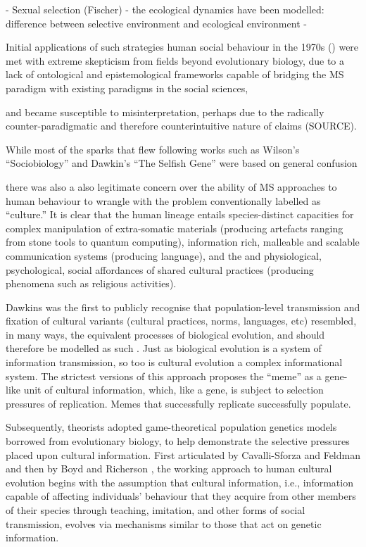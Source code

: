  - Sexual selection (Fischer)
 - the ecological dynamics have been modelled: difference between selective environment and ecological environment
 -

Initial applications of such strategies human social behaviour in the 1970s  (\citep{Wilson1975,Dawkins1976}) were met with extreme skepticism from fields beyond evolutionary biology, due to a lack of ontological and epistemological frameworks capable of bridging the MS paradigm with existing paradigms in the social sciences,

and became susceptible to misinterpretation, perhaps due to the radically counter-paradigmatic and therefore counterintuitive nature of claims (SOURCE).

While most of the sparks that flew following works such as Wilson's ``Sociobiology'' and Dawkin's ``The Selfish Gene'' were based on general confusion

 there was also a also legitimate concern over the ability of MS approaches to human behaviour to wrangle with the problem conventionally labelled as ``culture.'' It is clear that the human lineage entails species-distinct capacities for complex manipulation of extra-somatic materials (producing artefacts ranging from stone tools to quantum computing), information rich, malleable and scalable communication systems (producing language), and the and physiological, psychological, social affordances of shared cultural practices (producing phenomena such as religious activities).


Dawkins was the first to publicly recognise that population-level transmission and fixation of cultural variants (cultural practices, norms, languages, etc) resembled, in many ways, the equivalent processes of biological evolution, and should therefore be modelled as such \citep{Dawkins1976}.  Just as biological evolution is a system of information transmission, so too is cultural evolution a complex informational system.
The strictest versions of this approach proposes the ``meme'' as a gene-like unit of cultural information, which, like a gene, is subject to selection pressures of replication.  Memes that successfully replicate successfully populate\citep{Dawkins1976}.

Subsequently, theorists adopted game-theoretical population genetics models borrowed from evolutionary biology, to help demonstrate the selective pressures placed upon cultural information.  First articulated by Cavalli-Sforza and Feldman \textcite{Cavalli-Sforza1981} and then by Boyd and Richerson \textcite{Boyd1988}, the working approach to human cultural evolution begins with the assumption that cultural information, i.e., information capable of affecting individuals' behaviour that they acquire from other members of their species through teaching, imitation, and other forms of social transmission, evolves via mechanisms similar to those that act on genetic information.

